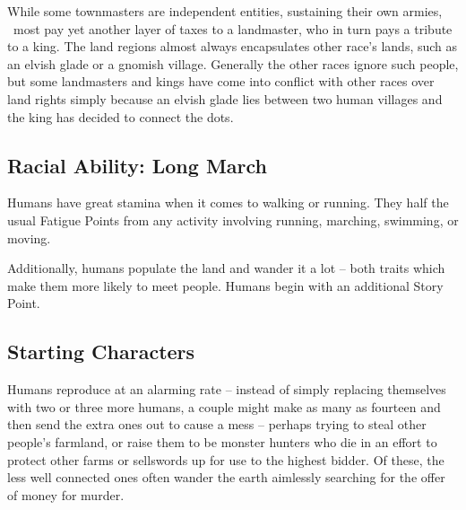 \begin{multicols}{2}
While some townmasters are independent entities, sustaining their own armies, \ most pay yet another layer of taxes to a landmaster, who in turn pays a tribute to a king. The land regions almost always encapsulates other race's lands, such as an elvish glade or a gnomish village. Generally the other races ignore such people, but some landmasters and kings have come into conflict with other races over land rights simply because an elvish glade lies between two human villages and the king has decided to connect the dots.

\subsection{Racial Ability: Long March}

Humans have great stamina when it comes to walking or running. They half the usual Fatigue Points from any activity involving running, marching, swimming, or moving.

Additionally, humans populate the land and wander it a lot -- both traits which make them more likely to meet people.
Humans begin with an additional Story Point.

\subsection{Starting Characters}

Humans reproduce at an alarming rate -- instead of simply replacing themselves with two or three more humans, a couple might make as many as fourteen and then send the extra ones out to cause a mess -- perhaps trying to steal other people's farmland, or raise them to be monster hunters who die in an effort to protect other farms or sellswords up for use to the highest bidder.
Of these, the less well connected ones often wander the earth aimlessly searching for the offer of money for murder.

\end{multicols}


